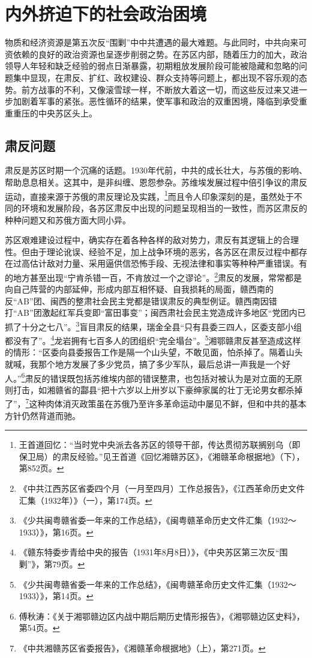 \chapter{内外挤迫下的社会政治困境}


物质和经济资源是第五次反“围剿”中中共遭遇的最大难题。与此同时，中共向来可资依赖的良好的政治资源也呈逐步削弱之势。在苏区内部，随着压力的加大，政治领导人年轻和缺乏经验的弱点日渐暴露，初期粗放发展阶段可能被隐藏和忽略的问题集中显现，在肃反、扩红、政权建设、群众支持等问题上，都出现不容乐观的态势。前方战事的不利，又像滚雪球一样，不断放大着这一切，而这些反过来又进一步加剧着军事的紧张。恶性循环的结果，使军事和政治的双重困境，降临到承受重重重压的中央苏区头上。

\section{肃反问题}


肃反是苏区时期一个沉痛的话题。1930年代前，中共的成长壮大，与苏俄的影响、帮助息息相关。这其中，是非纠缠、恩怨参杂。苏维埃发展过程中倍引争议的肃反运动，直接来源于苏俄的肃反理论及实践，\footnote{王首道回忆：“当时党中央派去各苏区的领导干部，传达贯彻苏联搁别乌（即保卫局）的肃反经验。”见王首道《回忆湘赣苏区》，《湘赣革命根据地》（下），第852页。}而且令人印象深刻的是，虽然处于不同的环境和发展阶段，各苏区肃反中出现的问题呈现相当的一致性，而苏区肃反的种种问题又和苏俄方面大同小异。


苏区艰难建设过程中，确实存在着各种各样的敌对势力，肃反有其逻辑上的合理性。但由于理论讹误、经验不足，加上战争环境的恶劣，各苏区在肃反过程中都存在过高估计敌对力量、采用逼供信恐怖手段、无视法律和事实等种种严重错误。有的地方甚至出现“宁肯杀错一百，不肯放过一个之谬论”。\footnote{《中共江西苏区省委四个月（一月至四月）工作总报告》，《江西革命历史文件汇集（1932年）》（一），第174页。}肃反的发展，常常都是向自己阵营的内部延伸，形成内部互相怀疑、自我损耗的局面，赣西南的反“AB”团、闽西的整肃社会民主党都是错误肃反的典型例证。赣西南因错打“AB”团激起红军兵变即“富田事变”；闽西肃社会民主党造成许多地区“党团内已抓了十分之七八”。\footnote{《少共闽粤赣省委一年来的工作总结》，《闽粤赣革命历史文件汇集（1932～1933）》，第16页。}盲目肃反的结果，瑞金全县“只有县委三四人，区委支部小组都没有了”。\footnote{《赣东特委步青给中央的报告（1931年8月8日）》，《中央苏区第三次反“围剿”》，第79页。}龙岩拥有七百多人的团组织“完全塌台”。\footnote{《少共闽粤赣省委一年来的工作总结》，《闽粤赣革命历史文件汇集（1932～1933）》，第14页。}湘鄂赣肃反甚至造成这样的情形：“区委向县委报告工作是隔一个山头望，不敢见面，怕杀掉了。隔着山头就喊，我那个地方发展了多少党员，搞了多少军队，最后总讲一声我是一个好人。”\footnote{傅秋涛：《关于湘鄂赣边区内战中期后期历史情形报告》，《湘鄂赣边区史料》，第54页。}肃反的错误既包括苏维埃内部的错误整肃，也包括对被认为是对立面的无原则打击，如湘赣省的酃县“把十六岁以上卅岁以下豪绅家属的壮丁无论男女都杀掉了”，\footnote{《中共湘赣苏区省委报告》，《湘赣革命根据地》（上），第271页。}这种肉体消灭政策虽在苏俄乃至许多革命运动中屡见不鲜，但和中共的基本方针仍然背道而驰。


